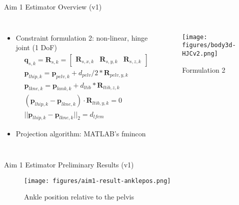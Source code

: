\documentclass[aspectratio=169]{beamer}
\newcommand{\mat}[1]{\mathbf{#1}}
\renewcommand{\vec}{\mathbf}
\begin{document}
        \begin{frame}{Aim 1 Estimator Overview (v1)}
            \begin{columns}
                \begin{itemize}
                    \item Constraint formulation 2: non-linear, hinge joint (1 DoF)
                         { \tiny \begin{align*}
                            & \vec{q}_{s, k} = \mat{R}_{s, k} = 
                                \begin{bmatrix}
                                    \vec{R}_{s, x, k} & \vec{R}_{s, y, k} & \vec{R}_{s, z, k}
                                \end{bmatrix} \\
    	                    & \vec{p}_{lhip, k} = \vec{p}_{pelv, k} + d_{pelv}/2*\vec{R}_{pelv, y, k} \\
                            & \vec{p}_{lkne, k} = \vec{p}_{lank, k} + d_{ltib}*\vec{R}_{ltib, z, k} \\
                            & (\vec{p}_{lhip, k} - \vec{p}_{lkne, k} ) \cdot \vec{R}_{ltib, y, k} = 0\\
                            & ||\vec{p}_{lhip, k} - \vec{p}_{lkne, k}||_2 = d_{lfem}
                        \end{align*} }%
                    \item Projection algorithm: MATLAB's fmincon
                \end{itemize}
                
                \begin{figure}
                    \centering
                    \texttt{[image: figures/body3d-HJCv2.png]}
                    \caption*{Formulation 2}
                \end{figure}
            \end{columns}
        \end{frame}
        
        \begin{frame}{Aim 1 Estimator Preliminary Results (v1)}
            \begin{figure}
                \texttt{[image: figures/aim1-result-anklepos.png]}
                \caption*{Ankle position relative to the pelvis}
            \end{figure}
            
        \end{frame}
        
\end{document}
